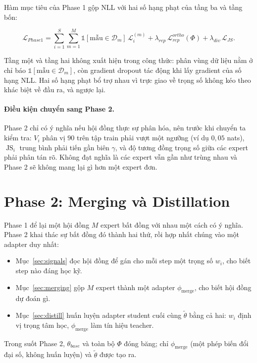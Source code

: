 \documentclass[12pt,a4paper]{article}
\DeclareMathOperator{\JS}{JS}
\newcommand{\pmerge}{\phi_{\mathrm{merge}}}
\begin{document}
Hàm mục tiêu của Phase 1 gộp NLL với hai số hạng phạt của tầng ba và tầng bốn:

\begin{equation}
\label{eq:phase1}
\mathcal{L}_{Phase1}
=
\sum_{i=1}^{S}\sum_{m=1}^{M}\mathbb{1}[\text{mẫu} \in \mathcal{D}_m]\,\mathcal{L}_i^{(m)}
+
\lambda_{rep}\,\mathcal{L}_{rep}^{ortho}(\Phi)
+
\lambda_{div}\,\mathcal{L}_{JS}.
\end{equation}

Tầng một và tầng hai không xuất hiện trong công thức: phân vùng dữ liệu nằm ở chỉ báo $\mathbb{1}[\text{mẫu} \in \mathcal{D}_m]$, còn gradient dropout tác động khi lấy gradient của số hạng NLL. Hai số hạng phạt bổ trợ nhau vì trực giao về trọng số không kéo theo khác biệt về đầu ra, và ngược lại.

\paragraph{Điều kiện chuyển sang Phase 2.}
Phase 2 chỉ có ý nghĩa nếu hội đồng thực sự phân hóa, nên trước khi chuyển ta kiểm tra: $V_i$ phân vị $90$ trên tập train phải vượt một ngưỡng (ví dụ $0{,}05$ nats), $\JS_i$ trung bình phải tiến gần biên $\gamma$, và độ tương đồng trọng số giữa các expert phải phân tán rõ. Không đạt nghĩa là các expert vẫn gần như trùng nhau và Phase 2 sẽ không mang lại gì hơn một expert đơn.

\section{Phase 2: Merging và Distillation}
\label{sec:phase2}

Phase 1 để lại một hội đồng $M$ expert bất đồng với nhau một cách có ý nghĩa. Phase 2 khai thác sự bất đồng đó thành hai thứ, rồi hợp nhất chúng vào một adapter duy nhất:

\begin{itemize}
\item Mục~\ref{sec:signals} đọc hội đồng để gán cho mỗi step một trọng số $w_i$, cho biết step nào đáng học kỹ.
\item Mục~\ref{sec:merging} gộp $M$ expert thành một adapter $\pmerge$, cho biết hội đồng dự đoán gì.
\item Mục~\ref{sec:distill} huấn luyện adapter student cuối cùng $\tilde\theta$ bằng cả hai: $w_i$ định vị trọng tâm học, $\pmerge$ làm tín hiệu teacher.
\end{itemize}

Trong suốt Phase 2, $\theta_{base}$ và toàn bộ $\Phi$ đóng băng; chỉ $\pmerge$ (một phép biến đổi đại số, không huấn luyện) và $\tilde\theta$ được tạo ra.
\end{document}
